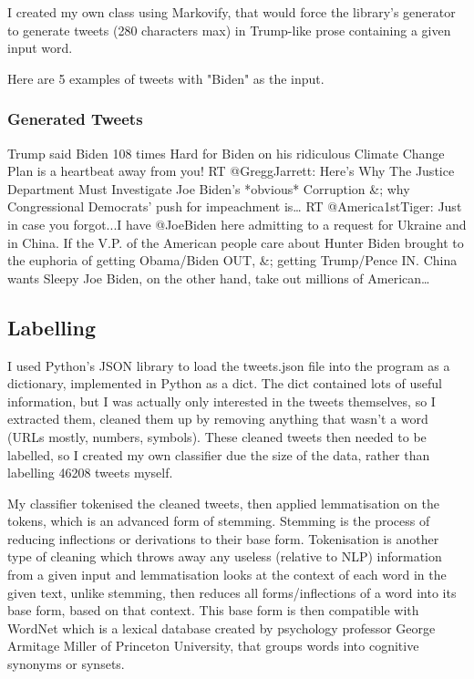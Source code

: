 \documentclass{article}
\begin{document}
I created my own class using Markovify, that would force the library's generator to generate tweets (280 characters max) in Trump-like prose containing a given input word.

Here are 5 examples of tweets with "Biden" as the input.

\subsubsection{Generated Tweets}
Trump said Biden 108 times
Hard for Biden on his ridiculous Climate Change Plan is a heartbeat away from you!
RT @GreggJarrett: Here’s Why The Justice Department Must Investigate Joe Biden’s *obvious* Corruption \&; why Congressional Democrats’ push for impeachment is…
RT @America1stTiger: Just in case you forgot...I have @JoeBiden here admitting to a request for Ukraine and in China.
If the V.P. of the American people care about Hunter Biden brought to the euphoria of getting Obama/Biden OUT, \&; getting Trump/Pence IN.
China wants Sleepy Joe Biden, on the other hand, take out millions of American…

\subsection{Labelling}

I used Python's JSON library to load the tweets.json file into the program as a dictionary, implemented in Python as a dict.
The dict contained lots of useful information, but I was actually only interested in the tweets themselves, so I extracted them, cleaned them up by removing anything that wasn't a word (URLs mostly, numbers, symbols).
These cleaned tweets then needed to be labelled, so I created my own classifier due the size of the data, rather than labelling 46208 tweets myself.

My classifier tokenised the cleaned tweets, then applied lemmatisation on the tokens, which is an advanced form of stemming.
Stemming is the process of reducing inflections or derivations to their base form.
Tokenisation is another type of cleaning which throws away any useless (relative to NLP) information from a given input and lemmatisation looks at the context of each word in the given text, unlike stemming, then reduces all forms/inflections of a word into its base form, based on that context.
This base form is then compatible with WordNet which is a lexical database created by psychology professor George Armitage Miller of Princeton University, that groups words into cognitive synonyms or synsets\autocite[14]{wn}.
\end{document}
